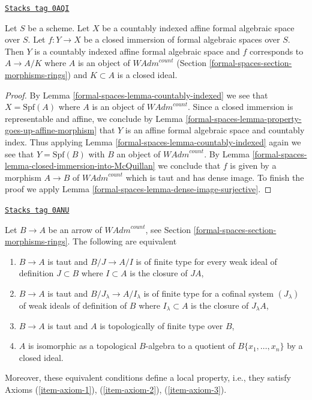 \begin{lemma}
\label{formal-spaces-lemma-closed-immersion-into-countably-indexed}
\href{https://stacks.math.columbia.edu/tag/0AQI}{\texttt{Stacks tag 0AQI}}

Let $S$ be a scheme. Let $X$ be a countably indexed affine formal algebraic
space over $S$. Let $f : Y \to X$ be a closed immersion of formal algebraic
spaces over $S$. Then $Y$ is a countably indexed affine formal algebraic space
and $f$ corresponds to $A \to A/K$ where $A$ is an object of
$\textit{WAdm}^{count}$
(Section \ref{formal-spaces-section-morphisms-rings})
and $K \subset A$ is a closed ideal.
\end{lemma}

\begin{proof}
By Lemma \ref{formal-spaces-lemma-countably-indexed}
we see that $X = \text{Spf}(A)$ where $A$ is an object of
$\textit{WAdm}^{count}$. Since a closed immersion is representable
and affine, we conclude by Lemma \ref{formal-spaces-lemma-property-goes-up-affine-morphism}
that $Y$ is an affine formal algebraic space and countably index.
Thus applying Lemma \ref{formal-spaces-lemma-countably-indexed}
again we see that $Y = \text{Spf}(B)$ with $B$ an object of
$\textit{WAdm}^{count}$. By Lemma \ref{formal-spaces-lemma-closed-immersion-into-McQuillan}
we conclude that $f$ is given by a morphism $A \to B$ of
$\textit{WAdm}^{count}$ which is taut and has dense image.
To finish the proof we apply
Lemma \ref{formal-spaces-lemma-dense-image-surjective}.
\end{proof}

\begin{lemma}
\label{formal-spaces-lemma-quotient-restricted-power-series}
\href{https://stacks.math.columbia.edu/tag/0ANU}{\texttt{Stacks tag 0ANU}}

Let $B \to A$ be an arrow of $\textit{WAdm}^{count}$, see
Section \ref{formal-spaces-section-morphisms-rings}.
The following are equivalent
\begin{enumerate}
\item[(a)] $B \to A$ is taut and $B/J \to A/I$ is of finite type for
every weak ideal of definition $J \subset B$ where $I \subset A$ is the
closure of $JA$,
\item[(b)] $B \to A$ is taut and $B/J_\lambda \to A/I_\lambda$
is of finite type for a cofinal system $(J_\lambda)$
of weak ideals of definition of $B$ where
$I_\lambda \subset A$ is the closure of $J_\lambda A$,
\item[(c)] $B \to A$ is taut and $A$ is topologically of finite
type over $B$,
\item[(d)] $A$ is isomorphic as a topological $B$-algebra to a quotient of
$B\{x_1, \ldots, x_n\}$ by a closed ideal.
\end{enumerate}
Moreover, these equivalent conditions define a local property,
i.e., they satisfy
Axioms (\ref{item-axiom-1}), (\ref{item-axiom-2}), (\ref{item-axiom-3}).
\end{lemma}

